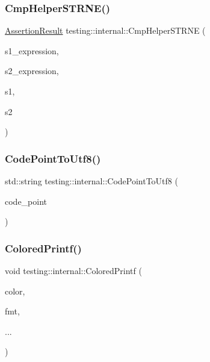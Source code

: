 \subsubsection{\texorpdfstring{Cmp\+Helper\+S\+T\+R\+N\+E()}{CmpHelperSTRNE()}\hspace{0.1cm}{\footnotesize\ttfamily [2/2]}}
{\footnotesize\ttfamily \hyperlink{classtesting_1_1_assertion_result}{Assertion\+Result} testing\+::internal\+::\+Cmp\+Helper\+S\+T\+R\+NE (\begin{DoxyParamCaption}\item[{const char $\ast$}]{s1\+\_\+expression,  }\item[{const char $\ast$}]{s2\+\_\+expression,  }\item[{const wchar\+\_\+t $\ast$}]{s1,  }\item[{const wchar\+\_\+t $\ast$}]{s2 }\end{DoxyParamCaption})}

\mbox{\label{namespacetesting_1_1internal_a0c0f9558efb9abb965851c4738cdc725}} 
\subsubsection{\texorpdfstring{Code\+Point\+To\+Utf8()}{CodePointToUtf8()}}
{\footnotesize\ttfamily std\+::string testing\+::internal\+::\+Code\+Point\+To\+Utf8 (\begin{DoxyParamCaption}\item[{\hyperlink{namespacetesting_1_1internal_a40d4fffcd2bf56f18b1c380615aa85e3}{U\+Int32}}]{code\+\_\+point }\end{DoxyParamCaption})}

\mbox{\label{namespacetesting_1_1internal_adef3055706176001364e54eb73a87e31}} 
\subsubsection{\texorpdfstring{Colored\+Printf()}{ColoredPrintf()}}
{\footnotesize\ttfamily void testing\+::internal\+::\+Colored\+Printf (\begin{DoxyParamCaption}\item[{\hyperlink{namespacetesting_1_1internal_a648c1bc94c2ef9e868ff3f9dff0f9c4e}{G\+Test\+Color}}]{color,  }\item[{const char $\ast$}]{fmt,  }\item[{}]{... }\end{DoxyParamCaption})}

